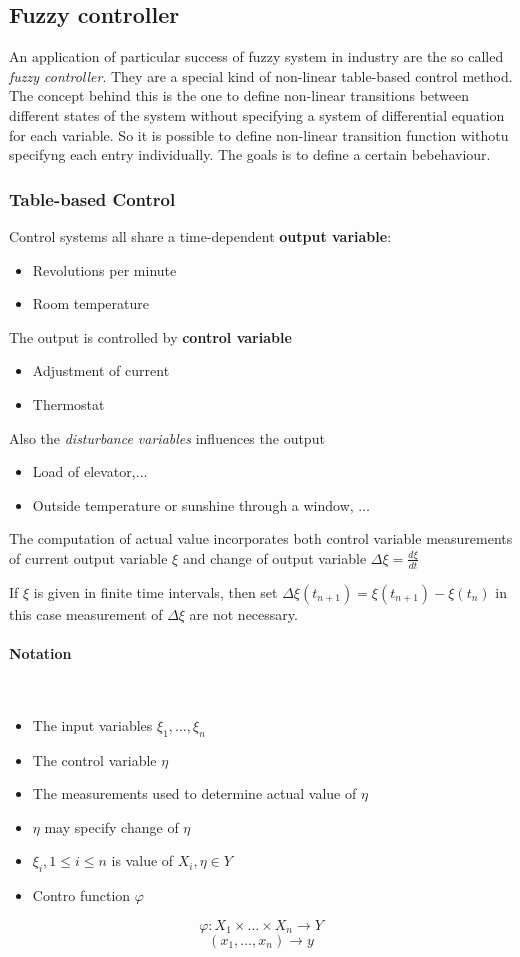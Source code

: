 \documentclass{article}
\begin{document}
\subsection{Fuzzy controller}
An application of particular success of fuzzy system
in industry are the so called \textit{fuzzy controller}. They are a
special kind of non-linear table-based control method.
The concept behind this is the one to define non-linear transitions between different states
of the system without specifying a system of differential equation for each variable.
So it is possible to define non-linear transition function withotu specifyng each entry individually.
The goals is to define a certain bebehaviour.

\subsubsection{Table-based Control}
Control systems all share a time-dependent \textbf{output variable}:
\begin{itemize}
    \item Revolutions per minute
    \item Room temperature
\end{itemize}
The output is controlled by \textbf{control variable}
\begin{itemize}
    \item Adjustment of current
    \item Thermostat
\end{itemize}
Also the \textit{disturbance variables} influences the output
\begin{itemize}
    \item Load of elevator,$\dots$
    \item Outside temperature or sunshine through a window, $\dots$
\end{itemize}
The computation of actual value incorporates both control variable measurements of current
output variable $\xi$ and change of output variable $\Delta\xi=\frac{d\xi}{dt}$

If $\xi$ is given in finite time intervals, then set $\Delta\xi (t_{n+1})=\xi (t_{n+1})-\xi(t_n)$
in this case measurement of $\Delta\xi$ are not necessary.

\paragraph{Notation}\mbox{}\\
\begin{itemize}
    \item The input variables $\xi_1,\dots,\xi_n$
    \item The control variable $\eta$
    \item The measurements used to determine actual value of $\eta$
    \item $\eta$ may specify change of $\eta$
    \item $\xi_i, 1\leq i\leq n$ is value of $X_i,\eta\in Y$
    \item Contro function $\varphi$
\end{itemize}
$$\varphi: X_1\times\dots\times X_n\rightarrow Y$$
$$(x_1,\dots,x_n)\rightarrow y$$
\end{document}
